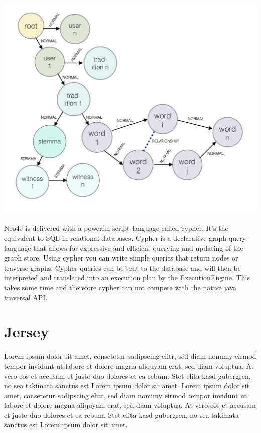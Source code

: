 \documentclass[11pt,fleqn,openany]{book} %
\begin{document}
\begin{center}
\includegraphics[scale=.5]{Pictures/database.png} 
\end{center} 
Neo4J is delivered with a powerful script language called cypher. It’s the equivalent to SQL in relational databases. Cypher is a declarative graph query language that allows for expressive and efficient querying and updating of the graph store. Using cypher you can write simple queries that return nodes or traverse graphs. Cypher queries can be sent to the database and will then be interpreted and translated into an execution plan by the ExecutionEngine. This takes some time and therefore cypher can not compete with the native java traversal API.



\chapter{Jersey}

Lorem ipsum dolor sit amet, consetetur sadipscing elitr, sed diam nonumy eirmod tempor invidunt ut labore et dolore magna aliquyam erat, sed diam voluptua. At vero eos et accusam et justo duo dolores et ea rebum. Stet clita kasd gubergren, no sea takimata sanctus est Lorem ipsum dolor sit amet. Lorem ipsum dolor sit amet, consetetur sadipscing elitr, sed diam nonumy eirmod tempor invidunt ut labore et dolore magna aliquyam erat, sed diam voluptua. At vero eos et accusam et justo duo dolores et ea rebum. Stet clita kasd gubergren, no sea takimata sanctus est Lorem ipsum dolor sit amet.
\end{document}
